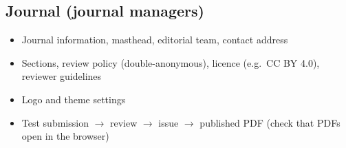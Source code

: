 \documentclass[11pt,a4paper]{report}
\newcommand{\checkitem}{\item[$\square$]}
\begin{document}
\subsection*{Journal (journal managers)}
\begin{itemize}[label={}]
  \checkitem Journal information, masthead, editorial team, contact address
  \checkitem Sections, review policy (double-anonymous), licence (e.g.\ CC BY 4.0), reviewer guidelines
  \checkitem Logo and theme settings
  \checkitem Test submission $\to$ review $\to$ issue $\to$ published PDF (check that PDFs open in the browser)
\end{itemize}

\appendix
\end{document}
